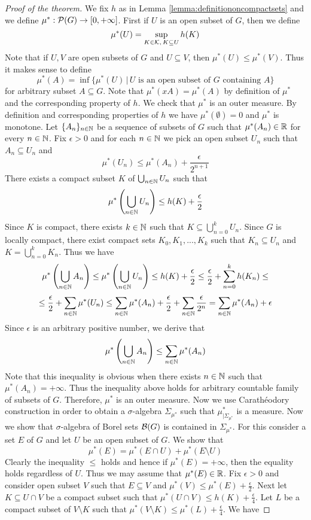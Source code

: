 \begin{proof}[Proof of the theorem]
We fix $h$ as in Lemma \ref{lemma:definitiononcompactsets} and we define $\mu^*:{\mathcal P}(G)\rightarrow [0,+\infty]$. First if $U$ is an open subset of $G$, then we define
$$\mu^*(U) = \sup_{K\in {\mathcal K},\,K\subseteq U}h(K)$$
Note that if $U, V$ are open subsets of $G$ and $U\subseteq V$, then $\mu^*(U)\leq \mu^*(V)$. Thus it makes sense to define
$$\mu^*(A) = \inf \big\{\mu^*(U)\,\big|\,U\mbox{ is an open subset of }G\mbox{ containing }A\big\}$$
for arbitrary subset $A\subseteq G$. Note that $\mu^*(xA) = \mu^*(A)$ by definition of $\mu^*$ and the corresponding property of $h$. We check that $\mu^*$ is an outer measure. By definition and corresponding properties of $h$ we have $\mu^*(\emptyset) = 0$ and $\mu^*$ is monotone. Let $\{A_n\}_{n\in {\mathbb N}}$ be a sequence of subsets of $G$ such that $\mu^*(A_n) \in {\mathbb R}$ for every $n\in {\mathbb N}$. Fix $\epsilon > 0$ and for each $n\in {\mathbb N}$ we pick an open subset $U_n$ such that $A_n\subseteq U_n$ and
$$\mu^*(U_n)\leq \mu^*(A_n)+\frac{\epsilon}{2^{n+1}}$$
There exists a compact subset $K$ of $\bigcup_{n\in {\mathbb N}}U_n$ such that
$$\mu^*\left(\bigcup_{n\in {\mathbb N}}U_n\right) \leq h(K) + \frac{\epsilon}{2}$$
Since $K$ is compact, there exists $k\in {\mathbb N}$ such that $K\subseteq \bigcup_{n=0}^kU_n$. Since $G$ is locally compact, there exist compact sets $K_0,K_1,...,K_k$ such that $K_n\subseteq U_n$ and $K = \bigcup_{n=0}^kK_n$. Thus we have
$$\mu^*\left(\bigcup_{n\in {\mathbb N}}A_n\right) \leq \mu^*\left(\bigcup_{n\in {\mathbb N}}U_n\right) \leq h(K) + \frac{\epsilon}{2} \leq \frac{\epsilon}{2} + \sum_{n=0}^kh(K_n) \leq$$
$$\leq \frac{\epsilon}{2} + \sum_{n\in {\mathbb N}}\mu^*(U_n)\leq \sum_{n\in {\mathbb N}}\mu^*(A_n) + \frac{\epsilon}{2}+ \sum_{n\in {\mathbb N}}\frac{\epsilon}{2^n} =  \sum_{n\in {\mathbb N}}\mu^*(A_n) + \epsilon $$
Since $\epsilon$ is an arbitrary positive number, we derive that
$$\mu^*\left(\bigcup_{n\in {\mathbb N}}A_n\right) \leq \sum_{n\in {\mathbb N}}\mu^*(A_n)$$
Note that this inequality is obvious when there exists $n\in {\mathbb N}$ such that $\mu^*(A_n) = +\infty$. Thus the inequality above holds for arbitrary countable family of subsets of $G$. Therefore, $\mu^*$ is an outer measure. Now we use Carath{\'e}odory construction {\cite[Theorem 3.2]{Measures}} in order to obtain a $\sigma$-algebra $\Sigma_{\mu^*}$ such that $\mu^*_{\mid \Sigma_{\mu^*}}$ is a measure. Now we show that $\sigma$-algebra of Borel sets ${\mathcal B}(G)$ is contained in $\Sigma_{\mu^*}$. For this consider a set $E$ of $G$ and let $U$ be an open subset of $G$. We show that
$$\mu^*(E) = \mu^*(E\cap U) + \mu^*(E\setminus U)$$
Clearly the inequality $\leq$ holds and hence if $\mu^*(E) = +\infty$, then the equality holds regardless of $U$. Thus we may assume that $\mu^*(E) \in {\mathbb R}$. Fix $\epsilon > 0$ and consider open subset $V$ such that $E\subseteq V$ and $\mu^*(V) \leq \mu^*(E)+\frac{\epsilon}{2}$. Next let $K\subseteq U\cap V$ be a compact subset such that $\mu^*(U\cap V) \leq h(K) +\frac{\epsilon}{4}$. Let $L$ be a compact subset of $V\setminus K$ such that $\mu^*(V\setminus K) \leq \mu^*(L) + \frac{\epsilon}{4}$. We have

\end{proof}
